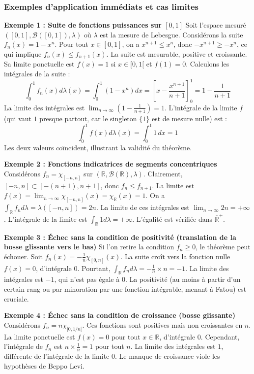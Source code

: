 \documentclass[11pt,a4paper]{article}
\begin{document}
\subsubsection*{Exemples d'application immédiats et cas limites}

\textbf{Exemple 1 : Suite de fonctions puissances sur $[0,1]$}
Soit l'espace mesuré $([0,1], \mathcal{B}([0,1]), \lambda)$ où $\lambda$ est la mesure de Lebesgue.
Considérons la suite $f_n(x) = 1 - x^n$.
Pour tout $x \in [0,1]$, on a $x^{n+1} \le x^n$, donc $-x^{n+1} \ge -x^n$, ce qui implique $f_n(x) \le f_{n+1}(x)$.
La suite est mesurable, positive et croissante. Sa limite ponctuelle est $f(x) = 1$ si $x \in [0,1[$ et $f(1) = 0$.
Calculons les intégrales de la suite :
$$\int_0^1 f_n(x) d\lambda(x) = \int_0^1 (1 - x^n) dx = \left[ x - \frac{x^{n+1}}{n+1} \right]_0^1 = 1 - \frac{1}{n+1}$$
La limite des intégrales est $\lim_{n \to \infty} \left( 1 - \frac{1}{n+1} \right) = 1$.
L'intégrale de la limite $f$ (qui vaut $1$ presque partout, car le singleton $\{1\}$ est de mesure nulle) est :
$$\int_0^1 f(x) d\lambda(x) = \int_0^1 1 \, dx = 1$$
Les deux valeurs coïncident, illustrant la validité du théorème.

\textbf{Exemple 2 : Fonctions indicatrices de segments concentriques}
Considérons $f_n = \chi_{[-n, n]}$ sur $(\mathbb{R}, \mathcal{B}(\mathbb{R}), \lambda)$.
Clairement, $[-n, n] \subset [-(n+1), n+1]$, donc $f_n \le f_{n+1}$.
La limite est $f(x) = \lim_{n \to \infty} \chi_{[-n, n]}(x) = \chi_{\mathbb{R}}(x) = 1$.
On a $\int_\mathbb{R} f_n d\lambda = \lambda([-n, n]) = 2n$.
La limite de ces intégrales est $\lim_{n \to \infty} 2n = +\infty$.
L'intégrale de la limite est $\int_\mathbb{R} 1 d\lambda = +\infty$.
L'égalité est vérifiée dans $\overline{\mathbb{R}}^+$.

\textbf{Exemple 3 : Échec sans la condition de positivité (translation de la bosse glissante vers le bas)}
Si l'on retire la condition $f_n \ge 0$, le théorème peut échouer.
Soit $f_n(x) = - \frac{1}{n} \chi_{[0, n]}(x)$.
La suite croît vers la fonction nulle $f(x) = 0$, d'intégrale $0$.
Pourtant, $\int_\mathbb{R} f_n d\lambda = - \frac{1}{n} \times n = -1$.
La limite des intégrales est $-1$, qui n'est pas égale à $0$. La positivité (au moins à partir d'un certain rang ou par minoration par une fonction intégrable, menant à Fatou) est cruciale.

\textbf{Exemple 4 : Échec sans la condition de croissance (bosse glissante)}
Considérons $f_n = n \chi_{]0, 1/n[}$. Ces fonctions sont positives mais non croissantes en $n$.
La limite ponctuelle est $f(x) = 0$ pour tout $x \in \mathbb{R}$, d'intégrale $0$.
Cependant, l'intégrale de $f_n$ est $n \times \frac{1}{n} = 1$ pour tout $n$.
La limite des intégrales est $1$, différente de l'intégrale de la limite $0$. Le manque de croissance viole les hypothèses de Beppo Levi.
\end{document}
